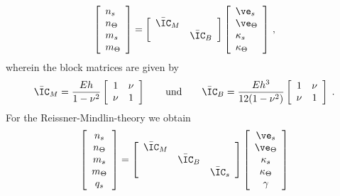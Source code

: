 \begin{eqnarray}
\left[
\begin{array}{l}
n_s \\ n_\Theta \\ m_s \\ m_\Theta
\end{array}
\right] = \left[
\begin{array}{cc}
{\bar{\IC}}_M & \\ & {\bar{\IC}}_B
\end{array}
\right] \left[
\begin{array}{l}
\ve_s \\ \ve_\Theta \\ \kappa_s \\ \kappa_\Theta
\end{array}
\right] \, ,
\label{klstoff}
\end{eqnarray} 
wherein the block matrices are given by 
\begin{eqnarray}
{\bar{\IC}}_M = \frac{Eh}{1-\nu^2}
\left[
\begin{array}{cc}
1 & \nu \\ \nu & 1
\end{array}
\right] 
\qquad \mbox{und} \qquad
{\bar{\IC}}_B = \frac{Eh^3}{12(1-\nu^2)}
\left[
\begin{array}{cc}
1 & \nu \\ \nu & 1
\end{array}
\right] \;.
\end{eqnarray}
For the Reissner-Mindlin-theory we obtain 
\begin{eqnarray}
\left[
\begin{array}{c}
n_s \\ n_\Theta \\ m_s \\ m_\Theta \\ q_s
\end{array}
\right] = \left[
\begin{array}{ccc}
{\bar{\IC}}_M & & \\ & {\bar{\IC}}_B & \\
& & \bar{\IC}_s
\end{array}
\right] \left[
\begin{array}{c}
\ve_s \\ \ve_\Theta \\ \kappa_s \\ \kappa_\Theta \\ \gamma
\end{array}
\right]
\label{rmstoff}
\end{eqnarray}
